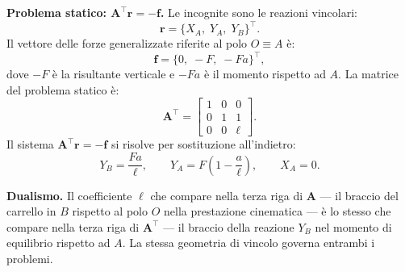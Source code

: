 \begin{esempio}
\begin{svolgimento}
		\smallskip
		\noindent\textbf{Problema statico:
			$\bm{A}^{\top}\bm{r} = -\bm{f}$.}
		Le incognite sono le reazioni vincolari:
		\begin{equation*}
			\bm{r} =
			\bigl\{X_A,\; Y_A,\; Y_B
			\bigr\}^\top.
		\end{equation*}
		Il vettore delle forze generalizzate riferite al polo
		$O \equiv A$ è:
		\begin{equation*}
			\bm{f} =
			\bigl\{0,\; -F,\; -Fa
			\bigr\}^\top,
		\end{equation*}
		dove $-F$ è la risultante verticale e $-Fa$ è il
		momento rispetto ad $A$. La matrice del problema
		statico è:
		\begin{equation*}\label{eq:B_es1}
			\bm{A}^{\top} =
			\begin{bmatrix}
				1 & 0 & 0 \\
				0 & 1 & 1 \\
				0 & 0 & \ell
			\end{bmatrix}.
		\end{equation*}
		Il sistema $\bm{A}^{\top}\bm{r} = -\bm{f}$ si
		risolve per sostituzione all'indietro:
		\begin{equation*}
			Y_B = \frac{Fa}{\ell}, \qquad
			Y_A = F\left(1 - \frac{a}{\ell}\right), \qquad
			X_A = 0.
		\end{equation*}
		
		\noindent\textbf{Dualismo.}
		Il coefficiente $\ell$ che compare nella terza riga
		di $\bm{A}$ --- il braccio del carrello in $B$
		rispetto al polo $O$ nella prestazione cinematica
		--- è lo stesso che compare nella terza riga di
		$\bm{A}^\top$ --- il braccio della reazione $Y_B$
		nel momento di equilibrio rispetto ad $A$. La stessa
		geometria di vincolo governa entrambi i problemi.
	\end{svolgimento}
\end{esempio}

